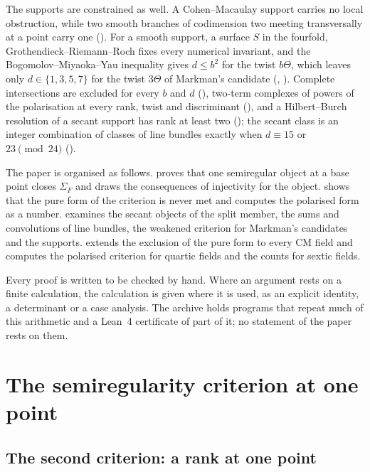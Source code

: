 \documentclass[11pt,reqno]{amsart}
\theoremstyle{plain}
\theoremstyle{definition}
\theoremstyle{remark}
\begin{document}
The supports are constrained as well. A Cohen--Macaulay support carries no
local obstruction, while two smooth branches of codimension two meeting
transversally at a point carry one (). For a smooth support, a surface $S$ in the
fourfold, Grothendieck--Riemann--Roch fixes every numerical invariant, and the
Bogomolov--Miyaoka--Yau inequality gives $d\le b^{2}$ for the twist
$b\Theta$, which leaves only $d\in\{1,3,5,7\}$ for the twist $3\Theta$ of
Markman's candidate (,
). Complete
intersections are excluded for every $b$ and $d$ (), two-term
complexes of powers of the polarisation at every rank, twist and
discriminant (), and a Hilbert--Burch resolution of a
secant support has rank at least two (); the secant
class is an integer combination of classes of line bundles exactly when
$d\equiv15$ or $23\pmod{24}$ ().


The paper is organised as follows.  proves that one
semiregular object at a base point closes $\Sigma_{F}$ and draws the
consequences of injectivity for the object.  shows that
the pure form of the criterion is never met and computes the polarised form
as a number.  examines the secant objects of the
split member, the sums and convolutions of line bundles, the weakened
criterion for Markman's candidates and the supports. 
extends the exclusion of the pure form to every CM field and computes the
polarised criterion for quartic fields and the counts for sextic fields.

Every proof is written to be checked by hand. Where an argument rests on a
finite calculation, the calculation is given where it is used, as an explicit
identity, a determinant or a case analysis. The archive \cite{BMB26} holds
programs that repeat much of this arithmetic and a Lean~4 certificate of
part of it; no statement of the paper rests on them.
\section{The semiregularity criterion at one point}\label{sec:rankpoint}

\subsection{The second criterion: a rank at one point}
\end{document}
